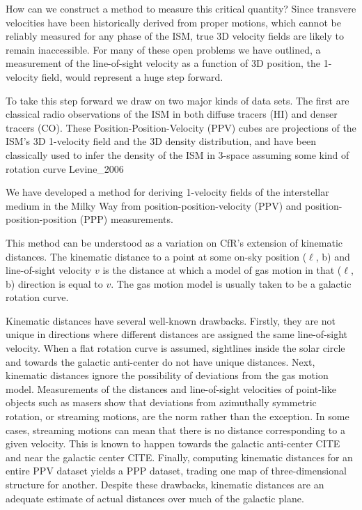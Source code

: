 How can we construct a method to measure this critical quantity? Since transvere velocities have been historically derived from proper motions, which cannot be reliably measured for any phase of the ISM, true 3D velocity fields are likely to remain inaccessible. 
For many of these open problems we have outlined, a measurement of the line-of-sight velocity as a function of 3D position, the 1-velocity field, would represent a huge step forward.

To take this step forward we draw on two major kinds of data sets. The first are classical radio observations of the ISM in both diffuse tracers (HI) and denser tracers (CO). These Position-Position-Velocity (PPV) cubes are projections of the ISM's 3D 1-velocity field and the 3D density distribution, and have been classically used to infer the density of the ISM in 3-space assuming some kind of rotation curve \cite{e.g.}{Levine_2006}

We have developed a method for deriving 1-velocity fields of the interstellar medium in the Milky Way from position-position-velocity (PPV) and position-position-position (PPP) measurements. 

This method can be understood as a variation on CfR's extension of kinematic distances.
The kinematic distance to a point at some on-sky position ($\ell$, b) and line-of-sight velocity $v$ is the distance at which a model of gas motion in that ($\ell$, b) direction is equal to $v$.
The gas motion model is usually taken to be a galactic rotation curve. 

Kinematic distances have several well-known drawbacks.
Firstly, they are not unique in directions where different distances are assigned the same line-of-sight velocity.
When a flat rotation curve is assumed, sightlines inside the solar circle and towards the galactic anti-center do not have unique distances. 
Next, kinematic distances ignore the possibility of deviations from the gas motion model.
Measurements of the distances and line-of-sight velocities of point-like objects such as masers show that deviations from azimuthally symmetric rotation, or streaming motions, are the norm rather than the exception.
In some cases, streaming motions can mean that there is no distance corresponding to a given velocity. 
This is known to happen towards the galactic anti-center CITE and near the galactic center CITE.
Finally, computing kinematic distances for an entire PPV dataset yields a PPP dataset, trading one map of three-dimensional structure for another.
Despite these drawbacks, kinematic distances are an adequate estimate of actual distances over much of the galactic plane.

